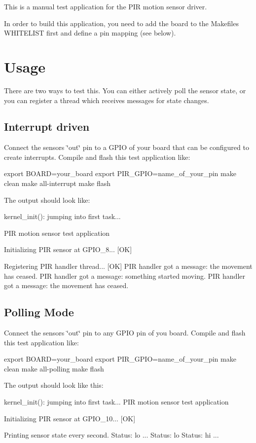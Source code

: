 This is a manual test application for the P\+IR motion sensor driver.

In order to build this application, you need to add the board to the Makefile\textquotesingle{}s {\ttfamily W\+H\+I\+T\+E\+L\+I\+ST} first and define a pin mapping (see below).

\section*{Usage}

There are two ways to test this. You can either actively poll the sensor state, or you can register a thread which receives messages for state changes.

\subsection*{Interrupt driven}

Connect the sensor\textquotesingle{}s \char`\"{}out\char`\"{} pin to a G\+P\+IO of your board that can be configured to create interrupts. Compile and flash this test application like\+: \begin{DoxyVerb}export BOARD=your_board
export PIR_GPIO=name_of_your_pin
make clean
make all-interrupt
make flash
\end{DoxyVerb}


The output should look like\+: \begin{DoxyVerb}kernel_init(): jumping into first task...

PIR motion sensor test application

Initializing PIR sensor at GPIO_8... [OK]

Registering PIR handler thread...     [OK]
PIR handler got a message: the movement has ceased.
PIR handler got a message: something started moving.
PIR handler got a message: the movement has ceased.
\end{DoxyVerb}


\subsection*{Polling Mode}

Connect the sensor\textquotesingle{}s \char`\"{}out\char`\"{} pin to any G\+P\+IO pin of you board. Compile and flash this test application like\+: \begin{DoxyVerb}export BOARD=your_board
export PIR_GPIO=name_of_your_pin
make clean
make all-polling
make flash
\end{DoxyVerb}


The output should look like this\+: \begin{DoxyVerb}kernel_init(): jumping into first task...
PIR motion sensor test application

Initializing PIR sensor at GPIO_10... [OK]

Printing sensor state every second.
Status: lo
...
Status: lo
Status: hi
...\end{DoxyVerb}
 